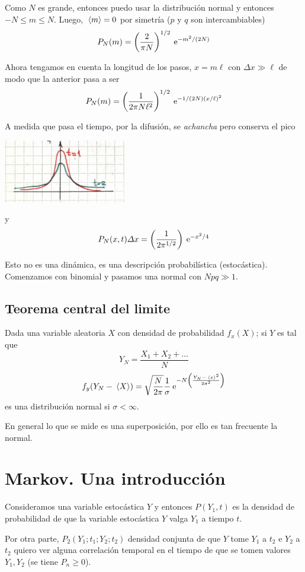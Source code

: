 \documentclass[10pt,oneside]{CBFT_book}
\begin{document}
Como $N$ es grande, entonces puedo usar la distribución normal y entonces $-N \leq m \leq N$.
Luego, $ \:\left\langle m \right\rangle = 0 $ por simetría ($p$ y $q$ son intercambiables)
\[
	P_N(m) = \left( \frac{ 2 }{ \pi N } \right)^{1/2} \:\mathrm{e}^{- m^2/(2N)}
\]

Ahora tengamos en cuenta la longitud de los pasos, $x = m \ell$ con $\Delta x \gg \ell$ de modo que
la anterior pasa a ser
\[
	P_N(m) = \left( \frac{ 1 }{ 2 \pi N \ell^2  } \right)^{1/2} \:\mathrm{e}^{- 1/(2N) (x/\ell)^2}
\]

A medida que pasa el tiempo, por la difusión, se {\it achancha} pero conserva el pico

\includegraphics[width=0.40\textwidth]{images/1606329120.jpg}

y
\[
	P_N(x,t) \Delta x = \left( \frac{ 1 }{ 2 \pi^{1/2} } \right) \:\mathrm{e}^{-x^2/4}
\]

Esto no es una dinámica, es una descripción probabilística (estocástica).
Comenzamos con binomial y pasamos una normal con $Npq \gg 1$.

\subsection{Teorema central del limite}

Dada una variable aleatoria $X$ con densidad de probabilidad $f_x(X)$; si $Y$ es tal que 
\[
	Y_N = \frac{X_1 + X_2 + ... }{ N }
\]
\[
	f_y( Y_N - \:\left\langle X \right\rangle ) = \sqrt{\frac{N}{2\pi}} \frac{1}{\sigma} 
		\:\mathrm{e}^{ -N \left( \frac{  Y_N - \:\left\langle x \right\rangle^2  }{ 2\sigma^2 } \right) }
\]
es una distribución normal si $\sigma < \infty $.

En general lo que se mide es una superposición, por ello es tan frecuente la normal.

\section{Markov. Una introducción}

Consideramos una variable estocástica $Y$ y entonces $P(Y_1,t)$ es la densidad de probabilidad
de que la variable estocástica $Y$ valga $Y_1$ a tiempo $t$.

Por otra parte, $P_2(Y_1;t_1;Y_2;t_2)$ densidad conjunta de que $Y$ tome $Y_1$ a $t_2$ e $Y_2$ a $t_2$
quiero ver alguna correlación temporal en el tiempo de que se tomen valores $Y_1, Y_2$ (se tiene
$P_n \geq 0$).
\end{document}
